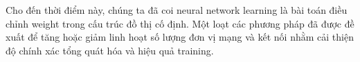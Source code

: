 Cho đến thời điểm này, chúng ta đã coi neural network learning là bài toán điều chỉnh weight trong cấu trúc đồ thị cố định. Một loạt các phương pháp đã được đề xuất để tăng hoặc giảm linh hoạt số lượng đơn vị mạng và kết nối nhằm cải thiện độ chính xác tổng quát hóa và hiệu quả training.

